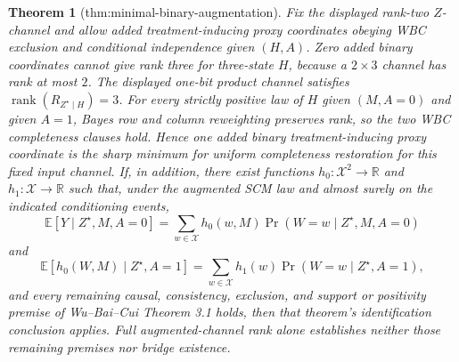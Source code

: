\documentclass{article}
\newtheorem{theorem}{Theorem}
\begin{document}
\begin{theorem}[thm:minimal-binary-augmentation]\label{thm:minimal-binary-augmentation}
Fix the displayed rank-two \(Z\)-channel and allow added treatment-inducing proxy coordinates obeying WBC exclusion and conditional independence given \((H,A)\). Zero added binary coordinates cannot give rank three for three-state \(H\), because a \(2\times3\) channel has rank at most \(2\). The displayed one-bit product channel satisfies \(\operatorname{rank}(R_{Z^{\star}\mid H})=3\). For every strictly positive law of \(H\) given \((M,A=0)\) and given \(A=1\), Bayes row and column reweighting preserves rank, so the two WBC completeness clauses hold. Hence one added binary treatment-inducing proxy coordinate is the sharp minimum for uniform completeness restoration for this fixed input channel. If, in addition, there exist functions \(h_0:\mathcal X^2\to\mathbb R\) and \(h_1:\mathcal X\to\mathbb R\) such that, under the augmented SCM law and almost surely on the indicated conditioning events,
\[
 \mathbb E[Y\mid Z^{\star},M,A=0]
 =\sum_{w\in\mathcal X}h_0(w,M)\Pr(W=w\mid Z^{\star},M,A=0)
\]
and
\[
 \mathbb E[h_0(W,M)\mid Z^{\star},A=1]
 =\sum_{w\in\mathcal X}h_1(w)\Pr(W=w\mid Z^{\star},A=1),
\]
and every remaining causal, consistency, exclusion, and support or positivity premise of Wu--Bai--Cui Theorem 3.1 holds, then that theorem's identification conclusion applies. Full augmented-channel rank alone establishes neither those remaining premises nor bridge existence.
\end{theorem}
\end{document}
